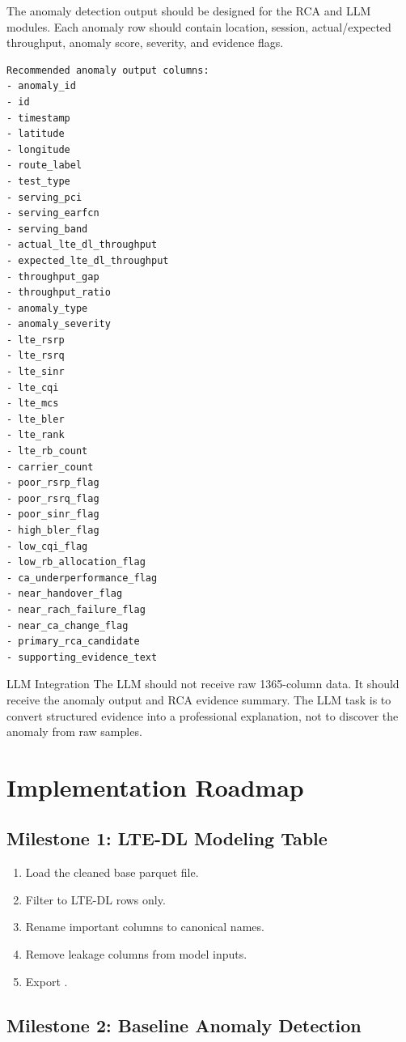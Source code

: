 \documentclass[12pt,a4paper]{article}
\newcommand{\fname}[1]{\texttt{\detokenize{#1}}}
\begin{document}
The anomaly detection output should be designed for the RCA and LLM modules. Each anomaly row should contain location, session, actual/expected throughput, anomaly score, severity, and evidence flags.

\begin{lstlisting}
Recommended anomaly output columns:
- anomaly_id
- id
- timestamp
- latitude
- longitude
- route_label
- test_type
- serving_pci
- serving_earfcn
- serving_band
- actual_lte_dl_throughput
- expected_lte_dl_throughput
- throughput_gap
- throughput_ratio
- anomaly_type
- anomaly_severity
- lte_rsrp
- lte_rsrq
- lte_sinr
- lte_cqi
- lte_mcs
- lte_bler
- lte_rank
- lte_rb_count
- carrier_count
- poor_rsrp_flag
- poor_rsrq_flag
- poor_sinr_flag
- high_bler_flag
- low_cqi_flag
- low_rb_allocation_flag
- ca_underperformance_flag
- near_handover_flag
- near_rach_failure_flag
- near_ca_change_flag
- primary_rca_candidate
- supporting_evidence_text
\end{lstlisting}

\begin{infobox}{LLM Integration}
The LLM should not receive raw 1365-column data. It should receive the anomaly output and RCA evidence summary. The LLM task is to convert structured evidence into a professional explanation, not to discover the anomaly from raw samples.
\end{infobox}

\section{Implementation Roadmap}

\subsection{Milestone 1: LTE-DL Modeling Table}

\begin{enumerate}
    \item Load the cleaned base parquet file.
    \item Filter to LTE-DL rows only.
    \item Rename important columns to canonical names.
    \item Remove leakage columns from model inputs.
    \item Export \fname{lte_dl_modeling_table.parquet}.
\end{enumerate}

\subsection{Milestone 2: Baseline Anomaly Detection}
\end{document}
